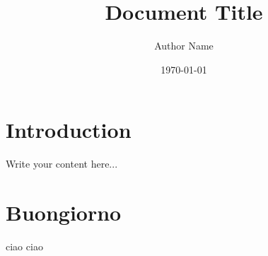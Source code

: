 \documentclass[11pt,a4paper]{article}
\title{Document Title}
\author{Author Name}
\date{\today}
\begin{document}
\maketitle

\section{Introduction}
Write your content here...

\section{Buongiorno}

\newpage
ciao
\newpage
ciao
\end{document}
